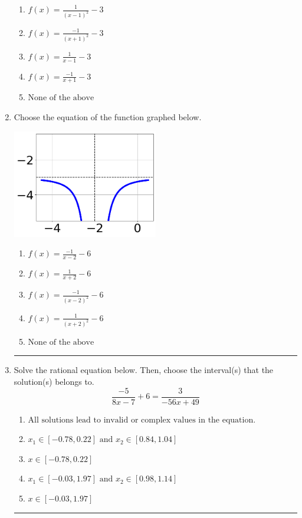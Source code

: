 \documentclass[14pt]{extbook}
\newcommand{\litem}[1]{\item#1\hspace*{-1cm}\rule{\textwidth}{0.4pt}}
\begin{document}
\begin{enumerate}
{\begin{center}
\end{center}
\begin{enumerate}[label=\Alph*.]
\item \( f(x) = \frac{1}{(x - 1)^2} - 3 \)
\item \( f(x) = \frac{-1}{(x + 1)^2} - 3 \)
\item \( f(x) = \frac{1}{x - 1} - 3 \)
\item \( f(x) = \frac{-1}{x + 1} - 3 \)
\item \( \text{None of the above} \)

\end{enumerate} }
\litem{
Choose the equation of the function graphed below.
\begin{center}
    \includegraphics[width=0.5\textwidth]{../Figures/rationalGraphToEquationCopyB.png}
\end{center}
\begin{enumerate}[label=\Alph*.]
\item \( f(x) = \frac{-1}{x - 2} - 6 \)
\item \( f(x) = \frac{1}{x + 2} - 6 \)
\item \( f(x) = \frac{-1}{(x - 2)^2} - 6 \)
\item \( f(x) = \frac{1}{(x + 2)^2} - 6 \)
\item \( \text{None of the above} \)

\end{enumerate} }
\litem{
Solve the rational equation below. Then, choose the interval(s) that the solution(s) belongs to.\[ \frac{-5}{8x -7} + 6 = \frac{3}{-56x + 49} \]\begin{enumerate}[label=\Alph*.]
\item \( \text{All solutions lead to invalid or complex values in the equation.} \)
\item \( x_1 \in [-0.78, 0.22] \text{ and } x_2 \in [0.84,1.04] \)
\item \( x \in [-0.78,0.22] \)
\item \( x_1 \in [-0.03, 1.97] \text{ and } x_2 \in [0.98,1.14] \)
\item \( x \in [-0.03,1.97] \)


\end{enumerate}}
\end{enumerate}
\end{document}
